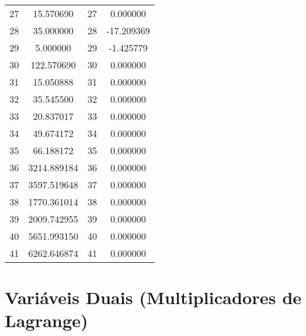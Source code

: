\documentclass[12pt]{article}
\begin{document}
\begin{longtable}{@{}cccc@{}}
27 & 15.570690 & 27 & 0.000000 \\
28 & 35.000000 & 28 & -17.209369 \\
29 & 5.000000 & 29 & -1.425779 \\
30 & 122.570690 & 30 & 0.000000 \\
31 & 15.050888 & 31 & 0.000000 \\
32 & 35.545500 & 32 & 0.000000 \\
33 & 20.837017 & 33 & 0.000000 \\
34 & 49.674172 & 34 & 0.000000 \\
35 & 66.188172 & 35 & 0.000000 \\
36 & 3214.889184 & 36 & 0.000000 \\
37 & 3597.519648 & 37 & 0.000000 \\
38 & 1770.361014 & 38 & 0.000000 \\
39 & 2009.742955 & 39 & 0.000000 \\
40 & 5651.993150 & 40 & 0.000000 \\
41 & 6262.646874 & 41 & 0.000000 \\

\end{longtable}

\section{Variáveis Duais (Multiplicadores de Lagrange)}
\end{document}
